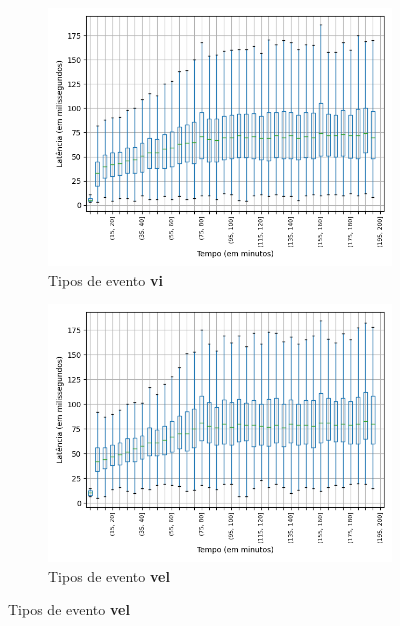 \begin{figure}
\begin{subfigure}{.5\textwidth}
\centering
\includegraphics[width=\textwidth]{figuras/graphics/boxplot_10-dez-su_vi.png}
\caption{Tipos de evento \textbf{vi}}
\label{fig:BoxPlot_vi_SU_10-dez-su}
\end{subfigure}%
\centering
\begin{subfigure}{.5\textwidth}
\centering
\includegraphics[width=\textwidth]{figuras/graphics/boxplot_10-dez-su_vel.png}
\caption{Tipos de evento \textbf{vel}}
\label{fig:BoxPlot_vel_SU_10-dez-su}
\end{subfigure}%


\end{figure}
